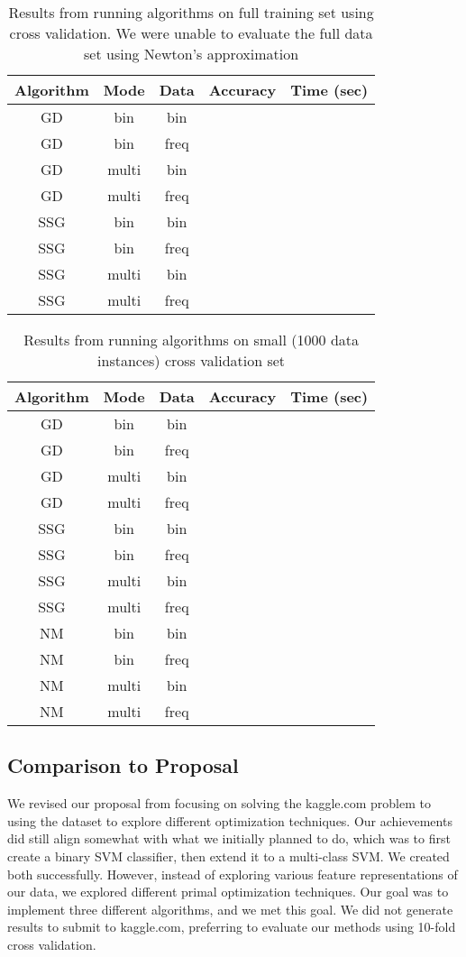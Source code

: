 \documentclass[letterpaper, 11pt]{article}
\begin{document}
\begin{table}
\label{fullset}
\centering
\begin{tabular}{c|cccc}
\textbf{Algorithm} & \textbf{Mode} & \textbf{Data} & \textbf{Accuracy} & \textbf{Time (sec)}\\
\hline
GD & bin & bin & & \\
GD & bin & freq & & \\
GD & multi & bin & & \\
GD & multi & freq & & \\
SSG & bin & bin & & \\
SSG & bin & freq & & \\
SSG & multi & bin & & \\
SSG & multi & freq & & \\
\end{tabular}
\caption{Results from running algorithms on full training set using cross validation.  We were unable to evaluate the full data set using Newton's approximation}
\end{table}

\begin{table}
\label{smallset}
\centering
\begin{tabular}{c|cccc}
\textbf{Algorithm} & \textbf{Mode} & \textbf{Data} & \textbf{Accuracy} & \textbf{Time (sec)}\\
\hline
GD & bin & bin & & \\
GD & bin & freq & & \\
GD & multi & bin & & \\
GD & multi & freq & & \\
SSG & bin & bin & & \\
SSG & bin & freq & & \\
SSG & multi & bin & & \\
SSG & multi & freq & & \\
NM & bin & bin & & \\
NM & bin & freq & & \\
NM & multi & bin & & \\
NM & multi & freq & & \\
\end{tabular}
\caption{Results from running algorithms on small (1000 data instances) cross validation set}
\end{table}

\subsection{Comparison to Proposal}
We revised our proposal from focusing on solving the kaggle.com problem to using the dataset to explore different optimization techniques.  Our achievements did still align somewhat with what we initially planned to do, which was to first create a binary SVM classifier, then extend it to a multi-class SVM.  We created both successfully.  However, instead of exploring various feature representations of our data, we explored different primal optimization techniques.  Our goal was to implement three different algorithms, and we met this goal.  We did not generate results to submit to kaggle.com, preferring to evaluate our methods using 10-fold cross validation. 



\nocite{*}
 

\end{document}
